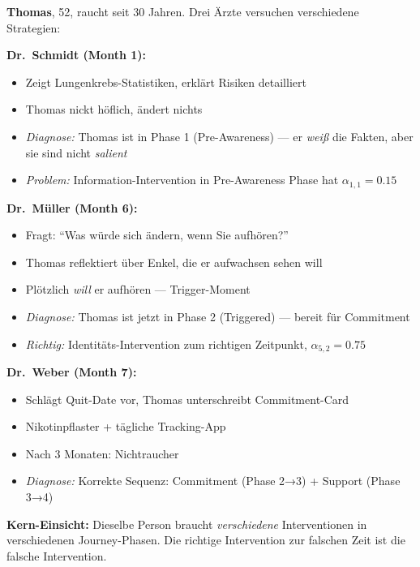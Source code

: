 \begin{tcolorbox}[colback=yellow!5!white, colframe=yellow!75!black,
    title=Intuition: Thomas und die drei Ärzte]

\textbf{Thomas}, 52, raucht seit 30 Jahren. Drei Ärzte versuchen verschiedene Strategien:

\textbf{Dr.\ Schmidt (Month 1):}
\begin{itemize}[nosep]
\item Zeigt Lungenkrebs-Statistiken, erklärt Risiken detailliert
\item Thomas nickt höflich, ändert nichts
\item \textit{Diagnose:} Thomas ist in Phase 1 (Pre-Awareness) --- er \textit{weiß} die Fakten, aber sie sind nicht \textit{salient}
\item \textit{Problem:} Information-Intervention in Pre-Awareness Phase hat $\alpha_{1,1} = 0.15$
\end{itemize}

\textbf{Dr.\ Müller (Month 6):}
\begin{itemize}[nosep]
\item Fragt: ``Was würde sich ändern, wenn Sie aufhören?''
\item Thomas reflektiert über Enkel, die er aufwachsen sehen will
\item Plötzlich \textit{will} er aufhören --- Trigger-Moment
\item \textit{Diagnose:} Thomas ist jetzt in Phase 2 (Triggered) --- bereit für Commitment
\item \textit{Richtig:} Identitäts-Intervention zum richtigen Zeitpunkt, $\alpha_{5,2} = 0.75$
\end{itemize}

\textbf{Dr.\ Weber (Month 7):}
\begin{itemize}[nosep]
\item Schlägt Quit-Date vor, Thomas unterschreibt Commitment-Card
\item Nikotinpflaster + tägliche Tracking-App
\item Nach 3 Monaten: Nichtraucher
\item \textit{Diagnose:} Korrekte Sequenz: Commitment (Phase 2→3) + Support (Phase 3→4)
\end{itemize}

\textbf{Kern-Einsicht:} Dieselbe Person braucht \textit{verschiedene} Interventionen in verschiedenen Journey-Phasen. Die richtige Intervention zur falschen Zeit ist die falsche Intervention.
\end{tcolorbox}

